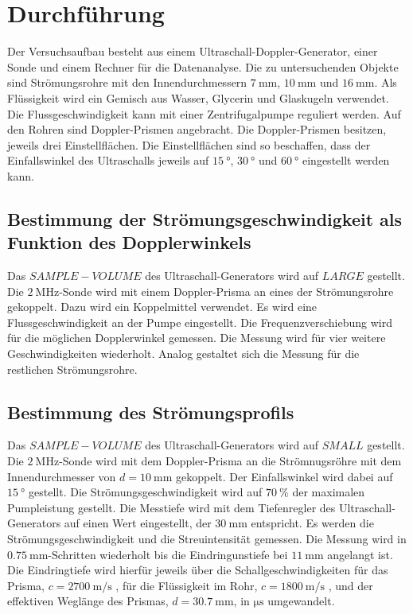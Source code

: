 \section{Durchführung}
\label{sec:Durchführung}
Der Versuchsaufbau besteht aus einem Ultraschall-Doppler-Generator, einer Sonde und einem Rechner für die Datenanalyse.
Die zu untersuchenden Objekte sind Strömungsrohre mit den Innendurchmessern $\SI{7}{\milli\meter}$, $\SI{10}{\milli\meter}$ und $\SI{16}{\milli\meter}$.
Als Flüssigkeit wird ein Gemisch aus Wasser, Glycerin und Glaskugeln verwendet.
Die Flussgeschwindigkeit kann mit einer Zentrifugalpumpe reguliert werden.
Auf den Rohren sind Doppler-Prismen angebracht.
Die Doppler-Prismen besitzen, jeweils drei Einstellflächen.
Die Einstellflächen sind so beschaffen, dass der Einfallswinkel des Ultraschalls jeweils auf $\SI{15}{\degree}$, $\SI{30}{\degree}$ und $\SI{60}{\degree}$ eingestellt werden kann.
\subsection{Bestimmung der Strömungsgeschwindigkeit als Funktion des Dopplerwinkels}
Das $SAMPLE-VOLUME$ des Ultraschall-Generators wird auf $LARGE$ gestellt.
Die $\SI{2}{\mega\hertz}$-Sonde wird mit einem Doppler-Prisma an eines der Strömungsrohre gekoppelt.
Dazu wird ein Koppelmittel verwendet.
Es wird eine Flussgeschwindigkeit an der Pumpe eingestellt.
Die Frequenzverschiebung wird für die möglichen Dopplerwinkel gemessen.
Die Messung wird für vier weitere Geschwindigkeiten wiederholt.
Analog gestaltet sich die Messung für die restlichen Strömungsrohre.
\subsection{Bestimmung des Strömungsprofils}
Das $SAMPLE-VOLUME$ des Ultraschall-Generators wird auf $SMALL$ gestellt.
Die $\SI{2}{\mega\hertz}$-Sonde wird mit dem Doppler-Prisma an die Strömnugsröhre mit dem Innendurchmesser von $d= \SI{10}{\milli\meter}$ gekoppelt.
Der Einfallswinkel wird dabei auf $\SI{15}{\degree}$ gestellt.
Die Strömungsgeschwindigkeit wird auf $\SI{70}{\percent}$ der maximalen Pumpleistung gestellt.
Die Messtiefe wird mit dem Tiefenregler des Ultraschall-Generators auf einen Wert eingestellt, der $\SI{30}{\milli\meter}$ entspricht.
Es werden die Strömungsgeschwindigkeit und die Streuintensität gemessen.
Die Messung wird in $\SI{0.75}{\milli\meter}$-Schritten wiederholt bis die Eindringunstiefe bei $\SI{11}{\milli\meter}$ angelangt ist.
Die Eindringtiefe wird hierfür jeweils über die Schallgeschwindigkeiten für das Prisma,
$c=\SI{2700}{\meter\per\second}$ \cite{prisma}, für die Flüssigkeit im Rohr,
$c=\SI{1800}{\meter\per\second}$ \cite{schlonze}, und der effektiven Weglänge des Prismas, $d=\SI{30.7}{\milli\meter}$, 
in $\si{\micro\second}$ umgewandelt.
